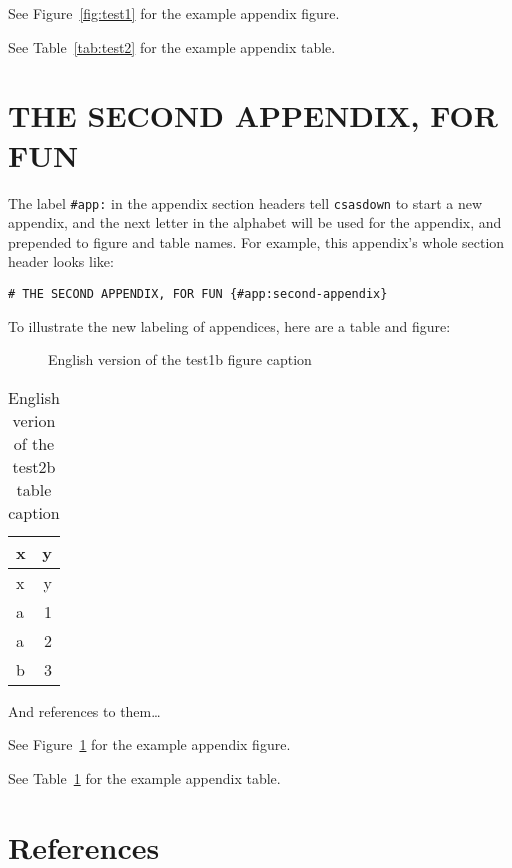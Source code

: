 \documentclass[12pt]{article}\usepackage[]{graphicx}\usepackage[]{color}
\begin{document}
\begin{appendices}
See Figure~\ref{fig:test1} for the example appendix figure.

See Table~\ref{tab:test2} for the example appendix table.

\clearpage

\section{THE SECOND APPENDIX, FOR FUN}
\label{app:second-appendix}

The label \texttt{\#app:} in the appendix section headers tell \texttt{csasdown} to start a new appendix, and the next letter in the alphabet will be used for the appendix, and prepended to figure and table names. For example, this appendix's whole section header looks like:

\texttt{\#\ THE\ SECOND\ APPENDIX,\ FOR\ FUN\ \{\#app:second-appendix\}}

To illustrate the new labeling of appendices, here are a table and figure:




\begin{figure}[htb]

{\centering {} 

}

\caption{English version of the test1b figure caption}\label{fig:test1b}
\end{figure}
\begin{longtable}[]{@{}lr@{}}
\caption{\label{tab:test2b}English verion of the test2b table caption}\tabularnewline
\toprule()
x & y \\
\midrule()
\endfirsthead
\toprule()
x & y \\
\midrule()
\endhead
a & 1 \\
a & 2 \\
b & 3 \\
\bottomrule()
\end{longtable}
And references to them\ldots{}

See Figure~\ref{fig:test1b} for the example appendix figure.

See Table~\ref{tab:test2b} for the example appendix table.

\end{appendices}

\clearpage

\hypertarget{references}{%
\section{References}\label{references}}
\end{document}

